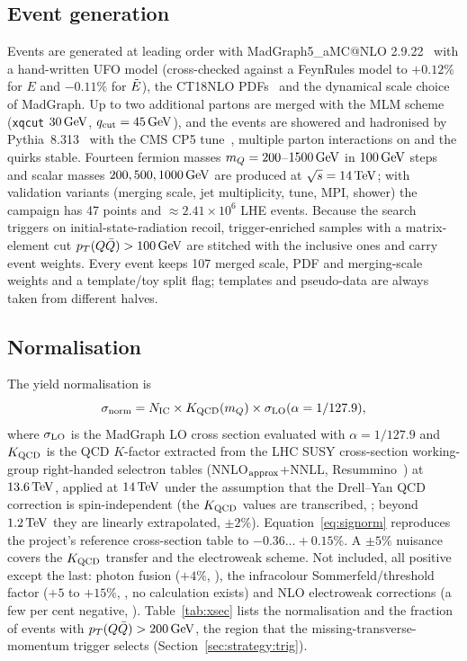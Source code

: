 \subsection{Event generation}\label{sec:model:gen}
Events are generated at leading order with MadGraph5\_aMC@NLO 2.9.22~\cite{Alwall:2014hca} with a hand-written UFO model
(cross-checked against a FeynRules model to $+0.12\%$ for $E$ and $-0.11\%$ for $\tilde{E}$), the CT18NLO
PDFs~\cite{Hou:2019efy} and the dynamical scale choice of MadGraph. Up to two additional partons are merged with the MLM
scheme~\cite{Alwall:2007fs} (\texttt{xqcut} $30\,\mathrm{GeV}$, $q_{\rm cut}=45\,\mathrm{GeV}$), and the events are showered and hadronised
by Pythia~8.313~\cite{Bierlich:2022pfr} with the CMS CP5 tune~\cite{CMS:2019csb}, multiple parton interactions on and
the quirks stable. Fourteen fermion masses $m_Q=200$--$1500\,\mathrm{GeV}$ in $100\,\mathrm{GeV}$ steps and scalar masses
$200,500,1000\,\mathrm{GeV}$ are produced at $\sqrt s=14\,\mathrm{TeV}$; with validation variants (merging scale, jet multiplicity, tune, MPI,
shower) the campaign has 47 points and $\approx2.41\times10^6$ LHE events. Because the search triggers on
initial-state-radiation recoil, trigger-enriched samples with a matrix-element cut $p_T(Q\bar Q)>100\,\mathrm{GeV}$ are stitched
with the inclusive ones and carry event weights. Every event keeps 107 merged scale, PDF and merging-scale weights and a
template/toy split flag; templates and pseudo-data are always taken from different halves.

\subsection{Normalisation}\label{sec:model:xsec}
The yield normalisation is
\begin{equation}
  \sigma_{\rm norm} = N_{\rm IC}\times K_{\rm QCD}(m_Q)\times \sigma_{\rm LO}(\alpha=1/127.9),
  \label{eq:signorm}
\end{equation}
where $\sigma_{\rm LO}$ is the MadGraph LO cross section evaluated with $\alpha=1/127.9$ and $K_{\rm QCD}$ is the QCD $K$-factor
extracted from the LHC SUSY cross-section working-group right-handed selectron tables (NNLO$_{\rm approx}$+NNLL,
Resummino~\cite{Fuks:2013vua}) at $13.6\,\mathrm{TeV}$, applied at $14\,\mathrm{TeV}$ under the assumption that the Drell--Yan QCD
correction is spin-independent (the $K_{\rm QCD}$ values are transcribed, \UNV{}; beyond $1.2\,\mathrm{TeV}$ they are linearly
extrapolated, $\pm2\%$). Equation~\eqref{eq:signorm} reproduces the project's reference cross-section table to
$-0.36\ldots+0.15\%$. A $\pm5\%$ nuisance covers the $K_{\rm QCD}$ transfer and the electroweak scheme. Not included, all positive
except the last: photon fusion ($+4\%$, \EST{}), the infracolour Sommerfeld/threshold factor ($+5$ to $+15\%$, \EST{},
no calculation exists) and NLO electroweak corrections (a few per cent negative, \UNV{}).
Table~\ref{tab:xsec} lists the normalisation and the fraction of events with $p_T(Q\bar Q)>200\,\mathrm{GeV}$, the region that
the missing-transverse-momentum trigger selects (Section~\ref{sec:strategy:trig}).

